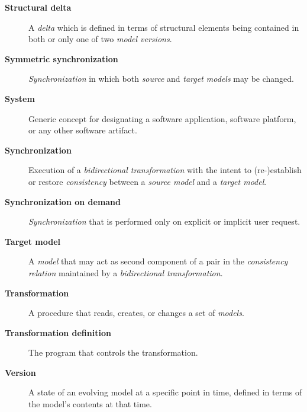 \begin{description}
	\item[\textbf{Structural delta}] A \emph{delta} which is defined in terms of structural elements being contained in both or only one of two \emph{model versions}.
	\item[\textbf{Symmetric synchronization}] \emph{Synchronization} in which both \emph{source} and \emph{target models} may be changed.
	\item[\textbf{System}] Generic concept for designating a software application, software platform, or any other software artifact.
	\item[\textbf{Synchronization}] Execution of a \emph{bidirectional transformation} with the intent to (re-)establish or restore \emph{consistency} between a \emph{source model} and a \emph{target model}.
	\item[\textbf{Synchronization on demand}] \emph{Synchronization} that is performed only on explicit or implicit user request.
	\item[\textbf{Target model}] A \emph{model} that may act as second component of a pair in the \emph{consistency relation} maintained by a \emph{bidirectional transformation}.
	\item[\textbf{Transformation}] A procedure that reads, creates, or changes a set of \emph{models}.
	\item[\textbf{Transformation definition}] The program that controls the transformation.
	\item[\textbf{Version}] A state of an evolving model at a specific point in time, defined in terms of the model's contents at that time.
\end{description}